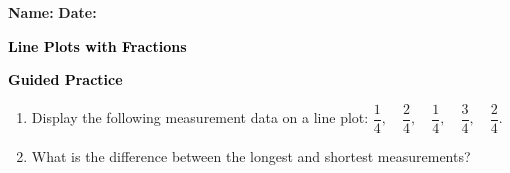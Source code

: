 \documentclass[12pt, letterpaper, fleqn]{article}
\begin{document}
\textbf{Name:} \underline{\hspace{5cm}}
\hfill
\textbf{Date:} \underline{\hspace{3cm}}\\

\begin{tcolorbox}[colback=customteal!20]
    \large\textcolor{black}{\textbf{Line Plots with Fractions}}
\end{tcolorbox}
\newpage
\begin{tcolorbox}[colback=customteal!20]
    \large\textcolor{black}{\textbf{Guided Practice}}
\end{tcolorbox}
\begin{enumerate}[itemsep=3.5cm, leftmargin=0.6cm]
\item Display the following measurement data on a line plot: $\dfrac{1}{4}, \quad \dfrac{2}{4}, \quad \dfrac{1}{4}, \quad \dfrac{3}{4}, \quad \dfrac{2}{4}$.
\vspace{4cm}
\item What is the difference between the longest and shortest measurements?
\end{enumerate}
\end{document}
